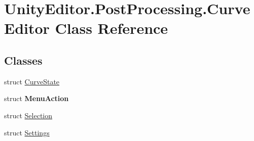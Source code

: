 \hypertarget{class_unity_editor_1_1_post_processing_1_1_curve_editor}{}\section{Unity\+Editor.\+Post\+Processing.\+Curve\+Editor Class Reference}
\label{class_unity_editor_1_1_post_processing_1_1_curve_editor}
\subsection*{Classes}
\begin{DoxyCompactItemize}
\item 
struct \hyperlink{struct_unity_editor_1_1_post_processing_1_1_curve_editor_1_1_curve_state}{Curve\+State}
\item 
struct {\bfseries Menu\+Action}
\item 
struct \hyperlink{struct_unity_editor_1_1_post_processing_1_1_curve_editor_1_1_selection}{Selection}
\item 
struct \hyperlink{struct_unity_editor_1_1_post_processing_1_1_curve_editor_1_1_settings}{Settings}
\end{DoxyCompactItemize}

